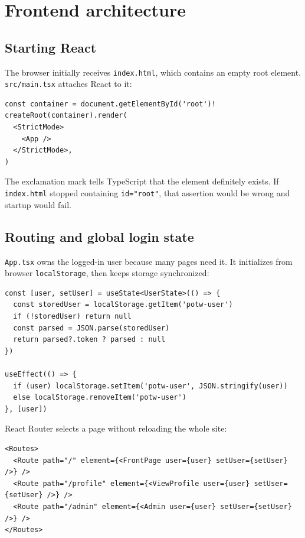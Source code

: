 \documentclass[11pt,oneside]{book}
\newcommand{\file}[1]{\texttt{#1}}
\newcommand{\code}[1]{\texttt{#1}}
\begin{document}
\chapter{Frontend architecture}

\section{Starting React}
The browser initially receives \file{index.html}, which contains an empty root element. \file{src/main.tsx} attaches React to it:

\begin{lstlisting}[title={src/main.tsx}]
const container = document.getElementById('root')!
createRoot(container).render(
  <StrictMode>
    <App />
  </StrictMode>,
)
\end{lstlisting}

The exclamation mark tells TypeScript that the element definitely exists. If \file{index.html} stopped containing \code{id="root"}, that assertion would be wrong and startup would fail.

\section{Routing and global login state}
\file{App.tsx} owns the logged-in user because many pages need it. It initializes from browser \code{localStorage}, then keeps storage synchronized:

\begin{lstlisting}[title={src/App.tsx, shortened}]
const [user, setUser] = useState<UserState>(() => {
  const storedUser = localStorage.getItem('potw-user')
  if (!storedUser) return null
  const parsed = JSON.parse(storedUser)
  return parsed?.token ? parsed : null
})

useEffect(() => {
  if (user) localStorage.setItem('potw-user', JSON.stringify(user))
  else localStorage.removeItem('potw-user')
}, [user])
\end{lstlisting}

React Router selects a page without reloading the whole site:

\begin{lstlisting}
<Routes>
  <Route path="/" element={<FrontPage user={user} setUser={setUser} />} />
  <Route path="/profile" element={<ViewProfile user={user} setUser={setUser} />} />
  <Route path="/admin" element={<Admin user={user} setUser={setUser} />} />
</Routes>
\end{lstlisting}
\end{document}
